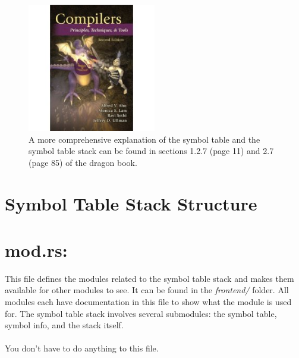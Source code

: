 \documentclass[
	12pt, %
]{fphw}
\begin{document}
\begin{figure}[h!]
    \centering
    \includegraphics[width=0.5\textwidth]{dragon.jpeg}
    \caption{A more comprehensive explanation of the symbol table and the symbol table stack can be found in sections 1.2.7 (page 11) and 2.7 (page 85) of the dragon book.}
    \label{fig:symbol_table_structure}
\end{figure}
\pagebreak

\section*{Symbol Table Stack Structure}



\section*{mod.rs:}
This file defines the modules related to the symbol table stack and makes them available for other modules to see. It can be found in the \textit{frontend/} folder. All modules each have documentation in this file to show what the module is used for. The symbol table stack involves several submodules: the symbol table, symbol info, and the stack itself.\\
\\
You don't have to do anything to this file.
\end{document}
